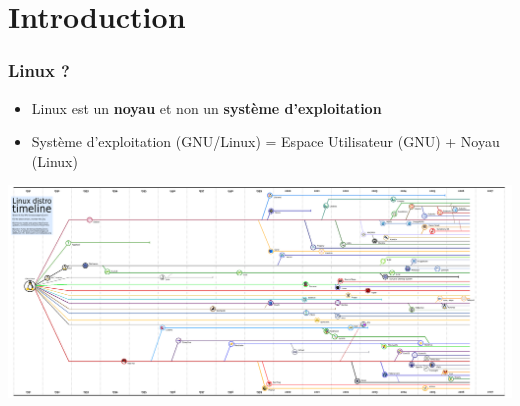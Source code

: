 \section*{Introduction}

\begin{frame}
    \frametitle{Linux ?}
        \begin{itemize}
            \item<1 -> Linux est un \textbf{noyau} et non un \textbf{système d'exploitation}
            \item<2 -> Système d'exploitation (GNU/Linux) = Espace Utilisateur (GNU) + Noyau (Linux)
        \end{itemize}
\end{frame}

\begin{frame}
        \begin{center}
            \includegraphics[width=\linewidth, height=\textheight, keepaspectratio]{linux_timeline.png}
        \end{center}
\end{frame}
